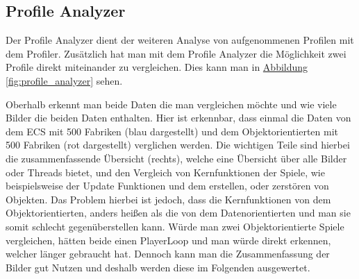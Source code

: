 \subsection{Profile Analyzer}
Der Profile Analyzer dient der weiteren Analyse von aufgenommenen Profilen mit dem Profiler. Zusätzlich hat man mit dem Profile Analyzer die Möglichkeit zwei Profile direkt miteinander zu vergleichen. Dies kann man in \hyperref[fig:profile_analyzer]{Abbildung \ref*{fig:profile_analyzer}} sehen.

Oberhalb erkennt man beide Daten die man vergleichen möchte und wie viele Bilder die beiden Daten enthalten. Hier ist erkennbar, dass einmal die Daten von dem ECS mit 500 Fabriken (blau dargestellt) und dem Objektorientierten mit 500 Fabriken (rot dargestellt) verglichen werden. Die wichtigen Teile sind hierbei die zusammenfassende Übersicht (rechts), welche eine Übersicht über alle Bilder oder Threads bietet, und den Vergleich von Kernfunktionen der Spiele, wie beispielsweise der Update Funktionen und dem erstellen, oder zerstören von Objekten. Das Problem hierbei ist jedoch, dass die Kernfunktionen von dem Objektorientierten, anders heißen als die von dem Datenorientierten und man sie somit schlecht gegenüberstellen kann. Würde man zwei Objektorientierte Spiele vergleichen, hätten beide einen PlayerLoop und man würde direkt erkennen, welcher länger gebraucht hat. Dennoch kann man die Zusammenfassung der Bilder gut Nutzen und deshalb werden diese im Folgenden ausgewertet.
